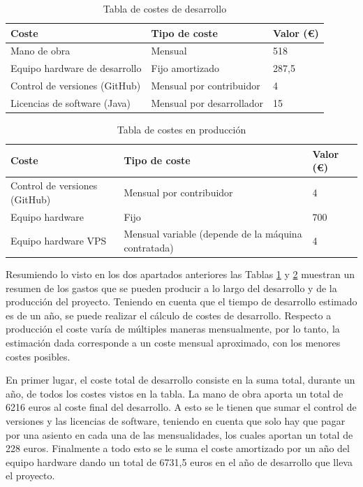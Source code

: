 \begin{table}[h]
	\centering
	\footnotesize
	\begin{tabularx}{\textwidth}{|X|X|X|}
		\hline
		\rowcolor[HTML]{C0C0C0}
		\textbf{Coste} & \textbf{Tipo de coste} & \textbf{Valor (€)} \\ \hline
		Mano de obra & Mensual & 518 \\ \hline
		Equipo hardware de desarrollo & Fijo amortizado & 287,5 \\ \hline
		Control de versiones (GitHub) & Mensual por contribuidor & 4 \\ \hline
		Licencias de software (Java) & Mensual por desarrollador & 15 \\ \hline
	\end{tabularx}
	\vspace{0.5cm}
	\caption{Tabla de costes de desarrollo}
	\label{tab:chap2_tabla_costes_desarrollo}
\end{table}

\begin{table}[h]
	\centering
	\footnotesize
	\begin{tabularx}{\textwidth}{|X|X|X|}
		\hline
		\rowcolor[HTML]{C0C0C0}
		\textbf{Coste} & \textbf{Tipo de coste} & \textbf{Valor (€)} \\ \hline
		Control de versiones (GitHub) & Mensual por contribuidor & 4 \\ \hline
		Equipo hardware & Fijo & 700 \\ \hline
		Equipo hardware VPS & Mensual variable (depende de la máquina contratada) & 4 \\ \hline
	\end{tabularx}
	\vspace{0.5cm}
	\caption{Tabla de costes en producción}
	\label{tab:chap2_tabla_costes_producción}
\end{table}

Resumiendo lo visto en los dos apartados anteriores las Tablas \ref{tab:chap2_tabla_costes_desarrollo} y \ref{tab:chap2_tabla_costes_producción} muestran un resumen de los gastos que se pueden producir a lo largo del desarrollo y de la producción del proyecto. Teniendo en cuenta que el tiempo de desarrollo estimado es de un año, se puede realizar el cálculo de costes de desarrollo. Respecto a producción el coste varía de múltiples maneras mensualmente, por lo tanto, la estimación dada corresponde a un coste mensual aproximado, con los menores costes posibles.

En primer lugar, el coste total de desarrollo consiste en la suma total, durante un año, de todos los costes vistos en la tabla. La mano de obra aporta un total de 6216 euros al coste final del desarrollo. A esto se le tienen que sumar el control de versiones y las licencias de software, teniendo en cuenta que solo hay que pagar por una asiento en cada una de las mensualidades, los cuales aportan un total de 228 euros. Finalmente a todo esto se le suma el coste amortizado por un año del equipo hardware dando un total de 6731,5 euros en el año de desarrollo que lleva el proyecto.

